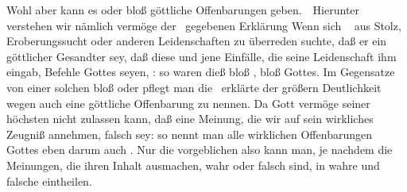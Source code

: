 Wohl aber kann es  oder bloß  göttliche Offenbarungen geben.~\ 
Hierunter verstehen wir nämlich vermöge der \ gegebenen Erklärung  Wenn sich \zB\  aus Stolz, Eroberungssucht oder anderen Leidenschaften zu überreden suchte, daß er ein göttlicher Gesandter sey, daß diese und jene Einfälle, die seine Leidenschaft ihm eingab, Befehle Gottes seyen, \udgl : so waren dieß bloß , bloß  Gottes. Im Gegensatze von einer solchen bloß  oder  pflegt man die \ erklärte der größern Deutlichkeit wegen auch eine  göttliche Offenbarung zu nennen. Da Gott vermöge seiner höchsten  nicht zulassen kann, daß eine Meinung, die wir auf sein wirkliches Zeugniß annehmen, falsch sey: so nennt man alle wirklichen Offenbarungen Gottes eben darum auch . Nur die vorgeblichen also kann man, je nachdem die Meinungen, die ihren Inhalt ausmachen, wahr oder falsch sind, in wahre und falsche eintheilen.

